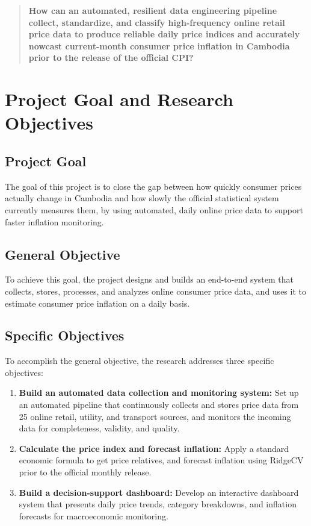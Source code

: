 \begin{quote}
\centering
\textbf{How can an automated, resilient data engineering pipeline collect, standardize, and classify high-frequency online retail price data to produce reliable daily price indices and accurately nowcast current-month consumer price inflation in Cambodia prior to the release of the official CPI?}
\end{quote}

\section{Project Goal and Research Objectives}

\subsection{Project Goal}
\hs The goal of this project is to close the gap between how quickly consumer prices actually change in Cambodia and how slowly the official statistical system currently measures them, by using automated, daily online price data to support faster inflation monitoring.

\subsection{General Objective}
\hs To achieve this goal, the project designs and builds an end-to-end system that collects, stores, processes, and analyzes online consumer price data, and uses it to estimate consumer price inflation on a daily basis.

\subsection{Specific Objectives}
\hs To accomplish the general objective, the research addresses three specific objectives:
\begin{enumerate}
    \item \textbf{Build an automated data collection and monitoring system:} Set up an automated pipeline that continuously collects and stores price data from 25 online retail, utility, and transport sources, and monitors the incoming data for completeness, validity, and quality.
    \item \textbf{Calculate the price index and forecast inflation:} Apply a standard economic formula to get price relatives, and forecast inflation using RidgeCV prior to the official monthly release.
    \item \textbf{Build a decision-support dashboard:} Develop an interactive dashboard system that presents daily price trends, category breakdowns, and inflation forecasts for macroeconomic monitoring.
\end{enumerate}

